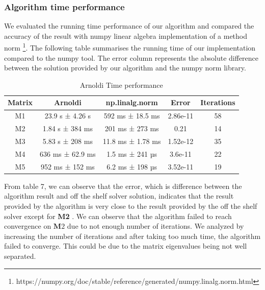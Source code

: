 \documentclass{article}
\numberwithin{equation}{section}
\begin{document}
\subsubsection{Algorithm time performance}
We evaluated the running time performance of our algorithm and compared the accuracy of the result with numpy linear algebra implementation of a method norm \footnote{https://numpy.org/doc/stable/reference/generated/numpy.linalg.norm.html}. The following table summarises the running time of our implementation compared to the numpy tool. The error column represents the absolute difference between the solution provided by our algorithm and the numpy norm library.
\begin{table}[hbt!]
    \centering
    \begin{tabular}{||c c c c c||}
 \hline
 Matrix & Arnoldi & np.linalg.norm & Error & Iterations \\ [0.8ex] 
 \hline\hline
 M1 & 23.9 s ± 4.26 s  & 592 ms ± 18.5 ms & 2.86e-11  & 58 \\ 
 \hline
 M2 & 1.84 s ± 384 ms  & 201 ms ± 273 ms & 0.21 & 14\\
 \hline
 M3 & 5.83 s ± 208 ms & 11.8 ms ± 1.78 ms & 1.52e-12 & 35 \\
 \hline
  M4 & 636 ms ± 62.9 ms & 1.5 ms ± 241 µs & 3.6e-11 & 22 \\
 \hline
 M5 & 952 ms ± 152 ms & 6.2 ms ± 198 µs & 3.52e-11 & 19 \\
 \hline
\end{tabular}
    \caption{ Arnoldi Time performance}
    \label{tab:my_label}
\end{table}

From table 7, we can observe that the error, which is difference between the algorithm result and off the shelf solver solution,  indicates that the result provided by the algorithm is very close to the result provided by the off the shelf solver except for \textbf{M2} . We can observe that the algorithm failed to reach convergence on $\boldsymbol M2$ due to not enough number of  iterations. We analyzed by increasing the number of iterations and after taking too much time, the algorithm failed to converge. This could be due to the matrix eigenvalues being not well separated.
\end{document}
